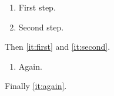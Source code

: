 \documentclass{article}
\begin{document}
\begin{enumerate}
\item First step.\label{it:first}
\item Second step.\label{it:second}
\end{enumerate}
Then \autoref{it:first} and \ref{it:second}.
\begin{enumerate}
\item Again.\label{it:again}
\end{enumerate}
Finally \autoref{it:again}.
\end{document}
